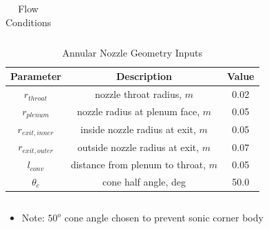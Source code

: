 \documentclass{beamer}
\begin{document}
\begin{frame}
\begin{columns}
\begin{column}{0.6\textwidth}
\begin{table}
\begin{tabular}{c|c|c}
        \end{tabular}
        \caption{Flow Conditions}
        \label{tab:flow-conditions}
      \end{table}
      \begin{table}
       \tiny
        \centering
        \begin{tabular}{c|c|c}
          Parameter & Description & Value \\
          \hline
          $r_{throat}$       &   nozzle throat radius, $m$           & 0.02 \\
          $r_{plenum}$       &   nozzle radius at plenum face, $m$   & 0.05 \\
          $r_{exit,inner}$   &   inside nozzle radius at exit, $m$   & 0.05 \\
          $r_{exit,outer}$   &   outside nozzle radius at exit, $m$  & 0.07 \\
          $l_{conv}$         &   distance from plenum to throat, $m$ & 0.05 \\
          $\theta_c$         &   cone half angle, deg                & 50.0
        \end{tabular}
        \caption{Annular Nozzle Geometry Inputs}
        \label{tab:annular-geom}
      \end{table}
    \end{column}
  \end{columns}
  \begin{itemize}
    \item Note: $50^o$ cone angle chosen to prevent sonic corner body
  \end{itemize}
\end{frame}
\end{document}

